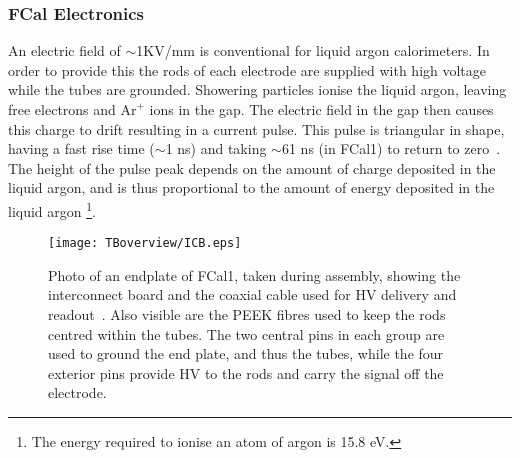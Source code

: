 \subsubsection{FCal Electronics}
\label{sec_FCal_electronics}

%
%



An electric field of  $\sim$1KV/mm is conventional for liquid argon calorimeters. In order to provide this the rods of each electrode are supplied with high voltage while the tubes are grounded. Showering particles ionise the liquid argon, leaving free electrons and $\mathrm{Ar}^+$ ions in the gap. The electric field in the gap then causes this charge to drift resulting in a current pulse. This pulse is triangular in shape, having a fast rise time ($\sim$1 ns) and taking $\sim$61 ns (in FCal1) to return to zero~\cite{FCal_jinst_2010}. The height of the pulse peak depends on the amount of charge deposited in the liquid argon, and is thus proportional to the amount of energy deposited in the liquid argon \footnote{The energy required to ionise an atom of argon is 15.8 eV.}.
 

 


\begin{figure}[tb]
\begin{center}
\texttt{[image: TBoverview/ICB.eps]}
\end{center}
\caption[Photograph of an FCal endplate]{Photo of an endplate of FCal1, taken during assembly, showing the interconnect board and the coaxial cable used for HV delivery and readout~\cite{FCal_jinst_2010}. Also visible are the PEEK fibres used to keep the rods centred within the tubes. The two central pins in each group are used to ground the end plate, and thus the tubes, while the four exterior pins provide HV to the rods and carry the signal off the electrode.}
\label{interconnect_fig}
\end{figure}

